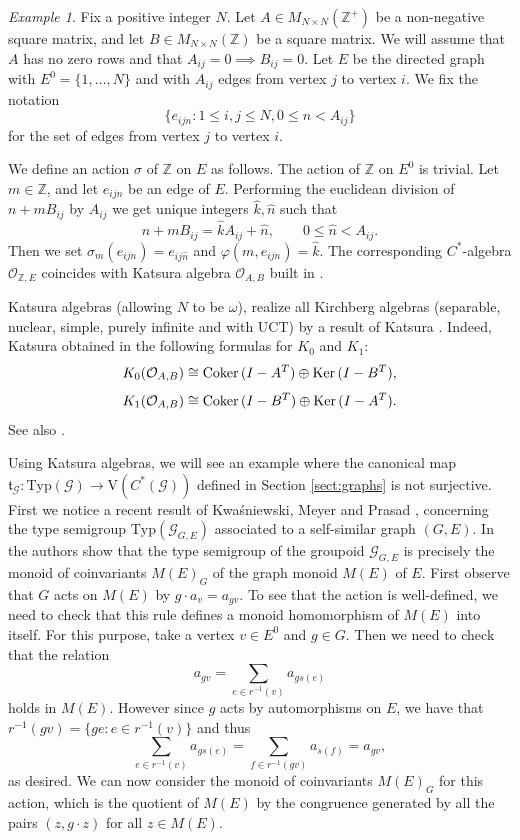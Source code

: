 \documentclass[11pt]{amsart}
\theoremstyle{plain}            %
\theoremstyle{definition}       %
\theoremstyle{definition}       %
\theoremstyle{remark}
\newtheorem{example}[theorem]{Example}
\newcommand{\V}{\mathrm{V}}
\newcommand{\Typ}{\mathrm{Typ}}
\def\Z{\mathbb{Z}}
\def\ker{{\rm Ker}\,}
\def\coker{{\rm Coker}\,}
\def\ker{{\rm Ker}\,}
\begin{document}
\begin{example}
	\label{exam:Katsura-algebras} Fix a positive integer $N$. Let $A\in M_{N\times N} (\Z^+)$ be a non-negative square matrix, and let $B\in M_{N\times N}(\Z)$ be a square matrix. We will assume that $A$ has no zero rows and that $A_{ij}=0\implies B_{ij}=0$. Let $E$ be the directed graph with $E^0=\{1,\dots ,N\}$ and with $A_{ij}$ edges from vertex $j$ to vertex $i$. We fix the notation 
	$$\{ e_{ijn} : 1\le i,j\le N, 0\le n < A_{ij}\}$$
	for the set of edges from vertex $j$ to vertex $i$.
	
	We define an action $\sigma$ of $\mathbb Z$ on $E$ as follows. The action of $\mathbb Z$ on $E^0$ is trivial. Let $m\in \Z$, and let $e_{ijn}$ be an edge of $E$. Performing the euclidean division of $n+mB_{ij}$ by $A_{ij}$ we get unique integers $\hat{k},\hat{n}$ such that  
	$$n+mB_{ij} = \hat{k}A_{ij} + \hat{n},\qquad 0\le \hat{n} <A_{ij}.$$
	Then we set $\sigma_m (e_{ijn}) = e_{ij\hat{n}}$ and $\varphi (m,e_{ijn}) = \hat{k}$. The corresponding $C^*$-algebra $\mathcal O_{\Z,E}$ coincides with Katsura algebra $\mathcal O _{A,B}$ built in \cite{kat08}. 
\end{example}

Katsura algebras (allowing $N$ to be $\omega$), realize all Kirchberg algebras (separable, nuclear, simple, purely infinite and with UCT) by a result of Katsura \cite{kat08}. Indeed, Katsura obtained in \cite{kat08} the following formulas for $K_0$ and $K_1$:
$$K_0 (\mathcal O_{A,B}) \cong \coker (I-A^T) \oplus \ker (I-B^T),$$
$$K_1 (\mathcal O_{A,B}) \cong \coker (I-B^T) \oplus \ker (I-A^T).$$
See also \cite{MS}.

Using Katsura algebras, we will see an example where the canonical map $\mathfrak{t}_{\mathcal G} \colon \Typ (\mathcal G)\to \V (C^*(\mathcal G))$ defined in Section \ref{sect:graphs} is not surjective.
First we notice a recent result of Kwaśniewski, Meyer and Prasad \cite{KMP25}, concerning the type semigroup $\Typ (\mathcal G_{G,E})$ associated to a self-similar graph $(G,E)$. In \cite[Corollary 7.7]{KMP25} the authors show that the type semigroup of the groupoid 
$\mathcal G _{G,E}$ is precisely the monoid of coinvariants $M(E)_G$ of the graph monoid $M(E)$ of $E$. 
First observe that $G$ acts on $M(E)$ by $g\cdot a_v = a_{gv}$. To see that the action is well-defined, we need to check that this rule defines a monoid homomorphism of $M(E)$ into itself. For this purpose, take a vertex $v\in E^0$ and $g\in G$. Then we need to check that the relation
$$a_{gv} = \sum_{e\in r^{-1}(v)} a_{gs(e)}$$
holds in $M(E)$. However since $g$ acts by automorphisms on $E$, we have that 
$r^{-1} (gv) = \{ ge: e\in r^{-1}(v)\}$ and thus
$$\sum_{e\in r^{-1}(v)} a_{gs(e)} = \sum_{f\in r^{-1}(gv)} a_{s(f)} = a_{gv},$$
as desired. We can now consider the monoid of coinvariants $M(E)_G$ for this action, which is the quotient of $M(E)$ by the congruence generated by all the pairs $(z, g\cdot z)$ for all $z\in M(E)$. 
\end{document}
